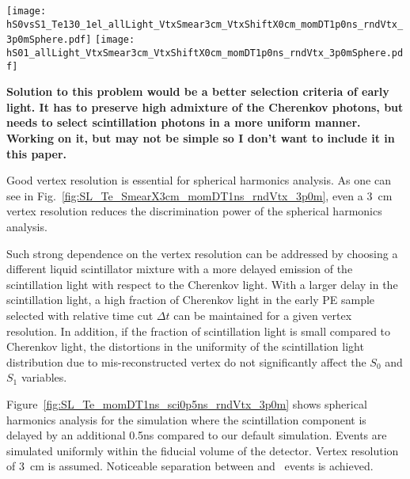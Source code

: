 \begin{figure*}[h]
  \centering
  \texttt{[image: hS0vsS1\_Te130\_1el\_allLight\_VtxSmear3cm\_VtxShiftX0cm\_momDT1p0ns\_rndVtx\_3p0mSphere.pdf]}
  \texttt{[image: hS01\_allLight\_VtxSmear3cm\_VtxShiftX0cm\_momDT1p0ns\_rndVtx\_3p0mSphere.pdf]}
  \caption{Spherical harmonics comparison between $^{130}$Te 0{\nbb}
    decay signal ($Q=2.529$~MeV) (\emph{red}) and $^{8}$B solar
    neutrinos background (\emph{blue}) for 1000 simulated
    events.Verticies are uniformly distributed within the fiducial
    volume, R$<$3~m. $^8$Be events are implemented as 2.529~MeV
    electrons with the initial momentum direction uniformly
    distributed within 4$\pi$ solid angle. Vetrex is smeared with 3~cm
    resolution. \emph{Left:} $S_0$ versus $S_1$ scatter plot. Black
    dotted line is a linear fit of these 2D histograms. Variable
    $S_{01}$ is defined as a projection of 2D distribution onto this
    linear fit. \emph{Right:} $S_{01}$}
\label{fig:SL_Te_SmearX3cm_momDT1ns_rndVtx_3p0m}
\end{figure*}


{\bf Solution to this problem would be a better selection criteria of
  early light. It has to preserve high admixture of the Cherenkov
  photons, but needs to select scintillation photons in a more uniform
  manner. Working on it, but may not be simple so I don't want to
  include it in this paper.}

Good vertex resolution is essential for spherical harmonics analysis. As one can see in Fig.~\ref{fig:SL_Te_SmearX3cm_momDT1ns_rndVtx_3p0m}, even a 3~cm vertex resolution reduces the discrimination power of the spherical harmonics analysis.

Such strong dependence on the vertex resolution can be
addressed by choosing a different liquid scintillator mixture with a
more delayed emission of the scintillation light with respect to the Cherenkov light. With a larger delay in the scintillation light, a high fraction of Cherenkov light in the early PE sample selected with relative time cut $\Delta t$ can be maintained for a given vertex resolution. In addition, if the fraction of scintillation light is small compared to Cherenkov light, the distortions in the uniformity of the scintillation light distribution due to mis-reconstructed vertex do not significantly affect the $S_0$ and $S_1$ variables.

Figure~\ref{fig:SL_Te_momDT1ns_sci0p5ns_rndVtx_3p0m} shows
spherical harmonics analysis for the simulation where the
scintillation component is delayed by an additional 0.5ns compared to our default simulation. Events are simulated uniformly within the fiducial volume of the detector. Vertex resolution of 3~cm is assumed. Noticeable separation between \nbb and \B~events is achieved.

